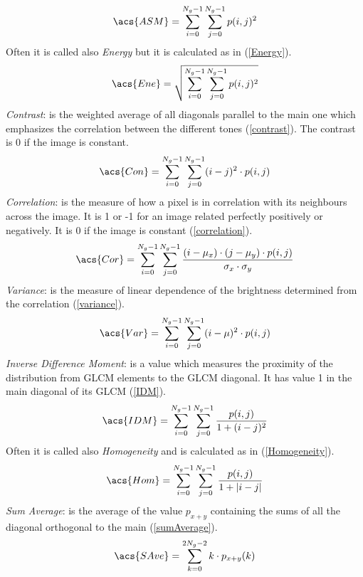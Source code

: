 \begin{equation}\label{asm}
\acs{ASM}=\sum_{i=0}^{N_{g}-1}\sum_{j=0}^{N_{g}-1}p(i,j)^2
\end{equation}
Often it is called also \textit{Energy} but it is calculated as in (\ref{Energy}).
\begin{equation}\label{Energy}
\acs{Ene}=\sqrt{\sum_{i=0}^{N_{g}-1}\sum_{j=0}^{N_{g}-1}p(i,j)^2}
\end{equation}
\textit{Contrast}: is the weighted average of all diagonals parallel to the main one which emphasizes the correlation between the different tones (\ref{contrast}). The contrast is 0 if the image is constant.
\begin{equation}\label{contrast}
\acs{Con}=\sum_{i=0}^{N_{g}-1}\sum_{j=0}^{N_{g}-1} (i-j)^2 \cdot p(i,j)
\end{equation}
\textit{Correlation}: is the measure of how a pixel is in correlation with its neighbours across the image. It is 1 or -1 for an image related perfectly positively or negatively. It is 0 if the image is constant (\ref{correlation}).
\begin{equation}\label{correlation}
\acs{Cor}=\sum_{i=0}^{N_{g}-1}\sum_{j=0}^{N_{g}-1}  \frac{(i-\mu_x) \cdot (j-\mu_y) \cdot p(i,j)}{\sigma_x \cdot \sigma_y}
\end{equation}
\textit{Variance}: is the measure of linear dependence of the brightness determined from the correlation (\ref{variance}).
\begin{equation}\label{variance}
\acs{Var}=\sum_{i=0}^{N_{g}-1}\sum_{j=0}^{N_{g}-1}(i-\mu)^2 \cdot p(i,j)
\end{equation}
\textit{Inverse Difference Moment}: is a value which measures the proximity of the distribution from GLCM elements to the GLCM diagonal. It has value 1 in the main diagonal of its GLCM (\ref{IDM}).
\begin{equation}\label{IDM}
\acs{IDM}=\sum_{i=0}^{N_{g}-1}\sum_{j=0}^{N_{g}-1}\frac{p(i,j)}{1 + (i-j)^2}
\end{equation}
Often it is called also \textit{Homogeneity} and is calculated as in (\ref{Homogeneity}).
\begin{equation}\label{Homogeneity}
\acs{Hom}=\sum_{i=0}^{N_{g}-1}\sum_{j=0}^{N_{g}-1}\frac{p(i,j)}{1 + |i-j|}
\end{equation}
\textit{Sum Average}: is the average of the value $p_{x+y}$ containing the sums of all the diagonal orthogonal to the main (\ref{sumAverage}).
\begin{equation}\label{sumAverage}
\acs{SAve}=\sum_{k=0}^{2N_{g}-2}k\cdot p_{x+y}(k)
\end{equation}
